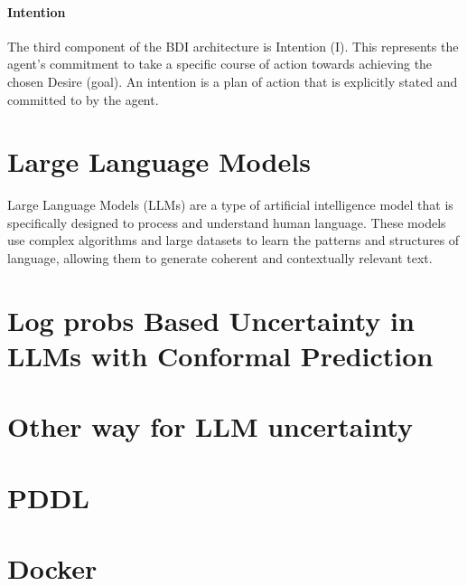 \paragraph{Intention}
The third component of the BDI architecture is Intention (I). This represents the
agent's commitment to take a specific course of action towards achieving the chosen
Desire (goal). An intention is a plan of action that is explicitly stated and
committed to by the agent.

\section{Large Language Models}
Large Language Models (LLMs) are a type of artificial intelligence model that is
specifically designed to process and understand human language. These models use
complex algorithms and large datasets to learn the patterns and structures of language,
allowing them to generate coherent and contextually relevant text.

\section{Log probs Based Uncertainty in LLMs with Conformal Prediction}

\section{Other way for LLM uncertainty}

\section{PDDL}

\section{Docker}